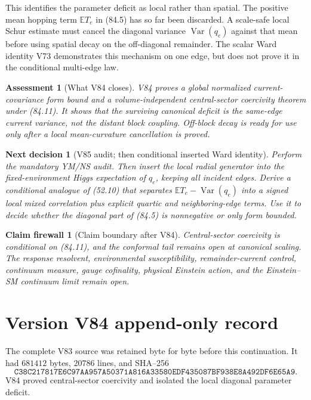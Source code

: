 \documentclass[11pt]{article}
\newtheorem{firewall}[theorem]{Claim firewall}
\newtheorem{decision}[theorem]{Next decision}
\newtheorem{assessment}[theorem]{Assessment}
\theoremstyle{remark}
\begin{document}
This identifies the parameter deficit as local rather than spatial.
The positive mean hopping term \(\mathbb ET_e\) in (84.5) has so far
been discarded.  A scale-safe local Schur estimate must cancel the
diagonal variance \(\operatorname{Var}(q_e)\) against that mean before
using spatial decay on the off-diagonal remainder.  The scalar Ward
identity V73 demonstrates this mechanism on one edge, but does not
prove it in the conditional multi-edge law.

\begin{assessment}[What V84 closes]
\label{ass:v17v84-status}
V84 proves a global normalized current-covariance form bound and a
volume-independent central-sector coercivity theorem under (84.11).
It shows that the surviving canonical deficit is the same-edge current
variance, not the distant block coupling.  Off-block decay is ready for
use only after a local mean-curvature cancellation is proved.
\end{assessment}

\begin{decision}[V85 audit; then conditional inserted Ward identity]
\label{dec:v17v84-next}
Perform the mandatory YM/NS audit.  Then insert the local radial
generator into the fixed-environment Higgs expectation of
\(q_e\), keeping all incident edges.  Derive a conditional analogue of
(52.10) that separates
\(\mathbb ET_e-\operatorname{Var}(q_e)\) into a signed local mixed
correlation plus explicit quartic and neighboring-edge terms.  Use it
to decide whether the diagonal part of (84.5) is nonnegative or only
form bounded.
\end{decision}

\begin{firewall}[Claim boundary after V84]
\label{fire:v17v84}
Central-sector coercivity is conditional on (84.11), and the conformal
tail remains open at canonical scaling.  The response resolvent,
environmental susceptibility, remainder-current control, continuum
measure, gauge cofinality, physical Einstein action, and the
Einstein--SM continuum limit remain open.
\end{firewall}

\section*{Version V84 append-only record}
The complete V83 source was retained byte for byte before this
continuation.  It had \(681412\) bytes, \(20786\) lines, and SHA--256
\[
 \texttt{C38C217817E6C97AA957A50371A816A33580EDF435087BF938E8A492DF6E65A9}.
\]
V84 proved central-sector coercivity and isolated the local diagonal
parameter deficit.
\end{document}
